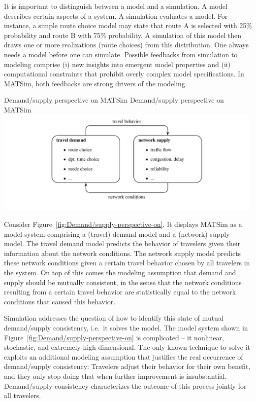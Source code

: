 It is important to distinguish between a \gls{model} and a \gls{simulation}. A
model describes certain aspects of a system. A simulation evaluates
a model. For instance, a simple route choice model may state that
route A is selected with 25\% probability and route B with 75\% probability.
A simulation of this model then draws one or more realizations (route
choices) from this distribution. One always needs a model before one
can simulate. Possible feedbacks from simulation to modeling comprise
(i) new insights into emergent model properties and (ii) computational
constraints that prohibit overly complex model specifications. In
MATSim, both feedbacks are strong drivers of the modeling. 


\createfigure%
{Demand/supply perspective on MATSim}%
{Demand/supply perspective on MATSim}%
{\label{fig:Demand/supply-perspective-on}}%
{\includegraphics[width=0.99\textwidth, angle=0]{understanding/figures/mc/fig0.pdf}}%
{}

Consider Figure~\ref{fig:Demand/supply-perspective-on}. It displays
MATSim as a model system comprising a (travel) demand model and a
(network) supply model. The travel demand model predicts the behavior
of travelers given their information about the network conditions.
The network supply model predicts these network conditions given a
certain travel behavior chosen by all travelers in the system. On
top of this comes the modeling assumption that demand and supply should
be mutually consistent, in the sense that the network conditions resulting
from a certain travel behavior are statistically equal to the network
conditions that caused this behavior.

Simulation addresses the question of how to identify this state of
mutual demand/supply consistency, i.e.\ it solves the model. The model
system shown in Figure~\ref{fig:Demand/supply-perspective-on} is
complicated -- it nonlinear, stochastic, and extremely high-dimensional.
The only known technique to solve it exploits an additional modeling
assumption that justifies the real occurrence of demand/supply consistency:
Travelers adjust their behavior for their own benefit, and they only
stop doing that when further improvement is insubstantial. Demand/supply
consistency characterizes the outcome of this process jointly for
all travelers.

